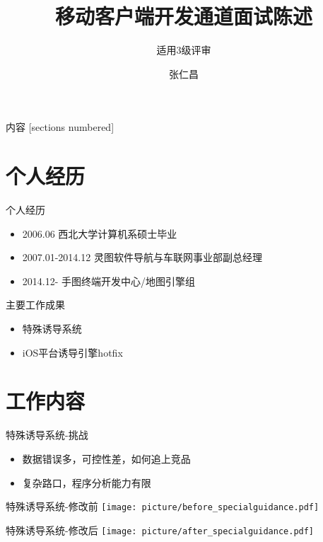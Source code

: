 \documentclass[10pt]{beamer}
\title{移动客户端开发通道面试陈述}
\subtitle{适用3级评审}
\author{张仁昌}
\institute{地图平台部/手图终端开发中心/地图引擎组}
\begin{document}
\maketitle

\begin{frame}{内容}
  [sections numbered]
  \tableofcontents[hideallsubsections]
\end{frame}

\section{个人经历}

\begin{frame}[fragile]{个人经历}
	\begin{itemize}
		\item 2006.06 西北大学计算机系硕士毕业
		\item 2007.01-2014.12 灵图软件导航与车联网事业部副总经理
		\item 2014.12- 手图终端开发中心/地图引擎组
	\end{itemize}
\end{frame}

\begin{frame}[fragile]{主要工作成果}
	\begin{itemize}
		\item 特殊诱导系统
		\item iOS平台诱导引擎hotfix
	\end{itemize}
\end{frame}

\section{工作内容}

\begin{frame}{特殊诱导系统-挑战}
  \begin{itemize}
    \item 数据错误多，可控性差，如何追上竞品
    \item 复杂路口，程序分析能力有限
  \end{itemize}
\end{frame}

\begin{frame}{特殊诱导系统-修改前}
\texttt{[image: picture/before\_specialguidance.pdf]}
\end{frame}

\begin{frame}{特殊诱导系统-修改后}
\texttt{[image: picture/after\_specialguidance.pdf]}
\end{frame}
\end{document}
